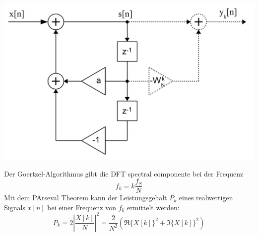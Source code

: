 \begin{center}
	\includegraphics[scale=.7]{./images/goertzel}
\end{center}
Der Goertzel-Algorithmus gibt die DFT spectral componente bei der Frequenz
\[ f_k = k\frac{f_S}{N} \]
Mit dem PArseval Theorem kann der Leistungsgehalt $P_k$ eines realwertigen
Signals $x[n]$ bei einer Frequenz von $f_k$ ermittelt werden:
\[
	P_k = 2\left| \frac{X[k]}{N} \right|^2
		= \frac{2}{N^2}(\Re\{X[k]\}^2+\Im\{X[k]\}^2)
\]
